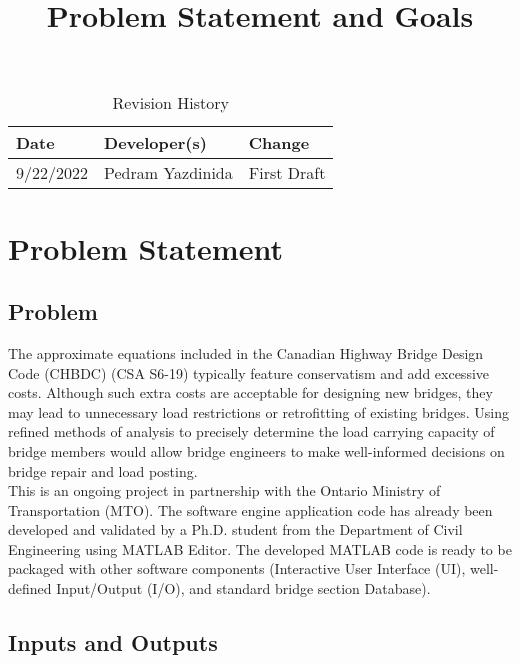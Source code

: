\documentclass{article}
\title{Problem Statement and Goals\\\progname}
\author{\authname}
\date{}
\begin{document}
\maketitle

\begin{table}[hp]
\caption{Revision History} \label{TblRevisionHistory}
\begin{tabularx}{\textwidth}{llX}
\toprule
\textbf{Date} & \textbf{Developer(s)} & \textbf{Change}\\
\midrule
9/22/2022 & Pedram Yazdinida & First Draft\\

\bottomrule
\end{tabularx}
\end{table}

\section{Problem Statement}


\subsection{Problem}

The approximate equations included in the Canadian Highway Bridge Design Code (CHBDC) (CSA S6-19) typically feature conservatism and add excessive costs. Although such extra costs are acceptable for designing new bridges, they may lead to unnecessary load restrictions or retrofitting of existing bridges. Using refined methods of analysis to precisely determine the load carrying capacity of bridge members would allow bridge engineers to make well-informed decisions on bridge repair and load posting.\\

This is an ongoing project in partnership with the Ontario Ministry of Transportation (MTO). The software engine application code has already been developed and validated by a Ph.D. student from the Department of Civil Engineering using MATLAB Editor. The developed MATLAB code is ready to be packaged with other software components (Interactive User Interface (UI), well-defined Input/Output (I/O), and standard bridge section Database). 

\pagebreak

\subsection{Inputs and Outputs}
\end{document}
